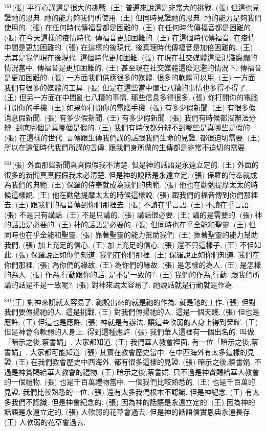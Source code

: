 \documentclass{book}
\begin{document}
$^{761}$(張) 平行心講這是很大的挑戰.
(王) 普遍來說這是非常大的挑戰.
(張) 但這也見證祂的恩典.
祂的能力夠我們所使用.
(王) 但同時見證祂的恩典.
祂的能力是夠我們使用的.
(張) 在任何時代傳福音都是困難的.
(王) 在任何時代傳福音都是困難的.
(張) 在今天這樣的疫情時代.
傳福音更加困難的.
(王) 在這個時代傳福音.
在疫情中間是更加困難的.
(張) 在這樣的後現代.
後真理時代傳福音是加倍困難的.
(王) 尤其是我們現在後現代.
這個時代更加困難.
(張) 在現在社交媒體這麼氾濫腐爛的情況當中.
傳福音是更加困難的.
(王) 甚至現在社交媒體這麼氾濫的情況下.
傳福音是更加困難的.
(張) 一方面我們供應很多的媒體.
很多的軟體可以用.
(王) 一方面我們有很多的媒體的工具.
(張) 但是在這些當中爛七八糟的事情也多得不得了.
(王) 但另一方面在中間亂七八糟的事情.
那些信息多得很多.
(張) 你打開你的電腦打開你的手機.
(王) 如果你打開你的電腦手機.
(張) 有多少假新聞.
(王) 有很多假消息假新聞.
(張) 有多少假新聞.
(王) 有多少假新聞.
(張) 我們有時候都沒辦法分辨.
到底哪個是真哪個是假的.
(王) 我們有時候都分辨不到哪些是真哪些是假的.
(張) 在這樣的世代.
言傳跟生傳我們講的話跟我們生命的見證.
都很迫切需要.
(王) 所以在這個時代我們所講的言傳.
跟我們身所做的生傳都是非常不迫切的需要.

$^{801}$(張) 外面那些新聞真真假假我不清楚.
但是神的話語是永遠立定的.
(王) 外面的很多的新聞真真假假我未必清楚.
但是神的說話是永遠立定.
(張) 保羅的侍奉就成為我們的典範.
(王) 保羅的侍奉就成為我們的典範.
(張) 他也在勸勉提摩太太的時候這樣說.
(王) 他在勸勉提摩太太的時候這樣說.
(張) 跟我們的福音傳到你們那裡去.
(王) 跟我們的福音傳到你們那裡去.
(張) 不讀在乎言語.
(王) 不讀在乎言語.
(張) 不是只有講話.
(王) 不是只講的.
(張) 講話很必要.
(王) 講的是需要的.
(張) 神的話語是必要的.
(王) 神的話語是必要的.
(張) 但同時也在乎全能和聖靈.
(王) 但同時也在乎全能和聖靈.
(張) 靠著聖靈的能力幫助我們.
(王) 靠著聖靈的能力幫助我們.
(張) 加上充足的信心.
(王) 加上充足的信心.
(張) 還不只這樣子.
(王) 不但如此.
(張) 保羅說正如你們知道.
我們在你們那裡.
(王) 保羅說正如你們知道.
我們在你們那裡.
(張) 為你們的緣故.
(王) 為你們的緣故.
(張) 是怎樣的為人.
(王) 是怎樣的為人.
(張) 作為,行動跟你的話.
是不是一致的?.
(王) 我們的作為,行動.
跟我們所講的話是不是一致呢?.
(張) 對神來說太容易了.
祂說話就是行動就是作為.

$^{841}$(王) 對神來說就太容易了.
祂說出來的就是祂的作為.
就是祂的工作.
(張) 但對我們要傳揚祂的人.
這是挑戰.
(王) 對我們傳揚祂的人.
這是一個天賤.
(張) 但也是應許.
(王) 但這也是應許.
(張) 神就是有辦法.
讓這些軟弱的人身上得到榮耀.
(王) 但是神會令軟弱的人身上.
得到這種應許.
(張) 我們華人這裡有一個出名的.
叫做「暗示之後,蔡書娟」.
大家都知道.
(王) 我們華人教會裡面.
有一位「暗示之後,蔡書娟」.
大家都可能知道.
(張) 其實在教會歷史當中.
在中西海外有太多這樣的見證.
(王) 在我們教會歷史中西海外.
都有很多這樣的見證.
(張) 暗示之後,蔡書娟.
不過是神賞賜給華人教會的禮物.
(王) 暗示之後,蔡書娟.
只不過是神賞賜給華人教會的一個禮物.
(張) 也是千百萬禮物當中.
一個我們比較熟悉的.
(王) 也是千百萬的見證.
我們比較熟悉的一位.
(張) 還有太多我們根本不認識.
但是神紀念.
(王) 有太多我們不認識.
但是神會紀念的.
(張) 因為神的話語是永遠立定的.
(王) 因為神的話語是永遠立定的.
(張) 人軟弱的花草會過去.
但是神的話語信實恩典永遠長存.
(王) 人軟弱的花草會過去.
\end{document}
